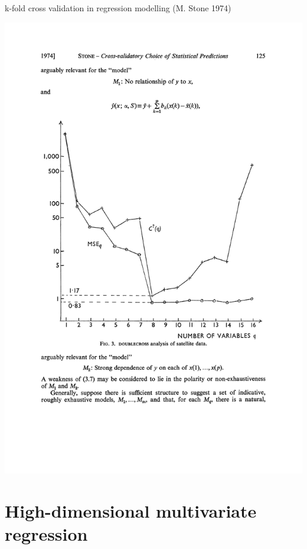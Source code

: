 \documentclass[
  ignorenonframetext,
  aspectratio=169]{beamer}
\begin{document}
\begin{frame}{k-fold cross validation in regression modelling (M. Stone
1974)}
\protect\hypertarget{k-fold-cross-validation-in-regression-modelling-m.-stone-1974}{}
\scriptsize

\begin{center}\includegraphics[height=.8\textheight]{Vis/Stone_CV} \end{center}

\normalsize
\end{frame}

\hypertarget{high-dimensional-multivariate-regression}{%
\section{High-dimensional multivariate
regression}\label{high-dimensional-multivariate-regression}}
\end{document}
